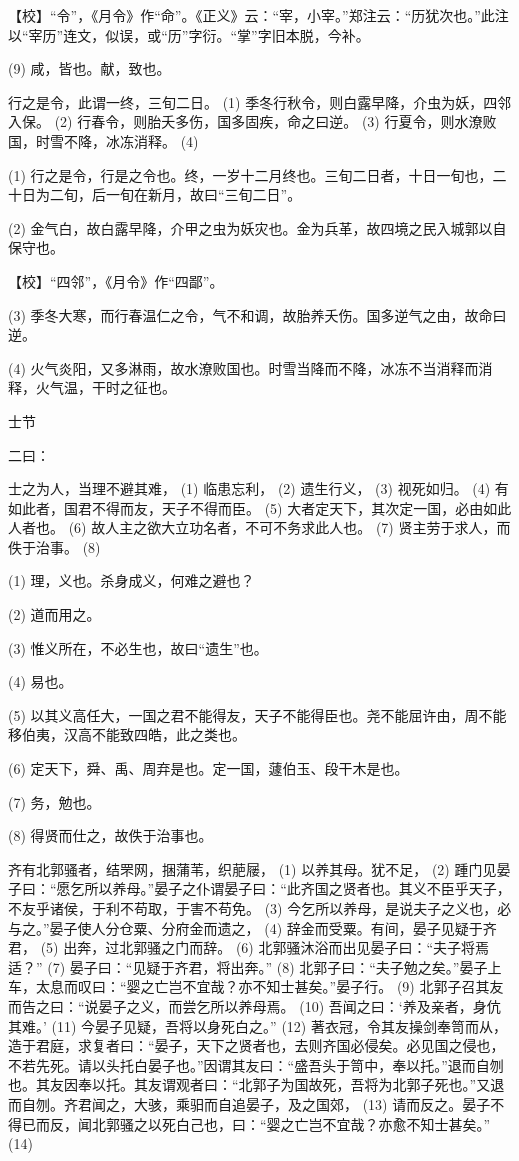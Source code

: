 \documentclass[12pt,UTF8]{ctexbook}
\begin{document}
【校】“令”，《月令》作“命”。《正义》云：“宰，小宰。”郑注云：“历犹次也。”此注以“宰历”连文，似误，或“历”字衍。“掌”字旧本脱，今补。

(9) 咸，皆也。献，致也。

行之是令，此谓一终，三旬二日。 (1) 季冬行秋令，则白露早降，介虫为妖，四邻入保。 (2) 行春令，则胎夭多伤，国多固疾，命之曰逆。 (3) 行夏令，则水潦败国，时雪不降，冰冻消释。 (4)

(1) 行之是令，行是之令也。终，一岁十二月终也。三旬二日者，十日一旬也，二十日为二旬，后一旬在新月，故曰“三旬二日”。

(2) 金气白，故白露早降，介甲之虫为妖灾也。金为兵革，故四境之民入城郭以自保守也。

【校】“四邻”，《月令》作“四鄙”。

(3) 季冬大寒，而行春温仁之令，气不和调，故胎养夭伤。国多逆气之由，故命曰逆。

(4) 火气炎阳，又多淋雨，故水潦败国也。时雪当降而不降，冰冻不当消释而消释，火气温，干时之征也。





士节


二曰：

士之为人，当理不避其难， (1) 临患忘利， (2) 遗生行义， (3) 视死如归。 (4) 有如此者，国君不得而友，天子不得而臣。 (5) 大者定天下，其次定一国，必由如此人者也。 (6) 故人主之欲大立功名者，不可不务求此人也。 (7) 贤主劳于求人，而佚于治事。 (8)

(1) 理，义也。杀身成义，何难之避也？

(2) 道而用之。

(3) 惟义所在，不必生也，故曰“遗生”也。

(4) 易也。

(5) 以其义高任大，一国之君不能得友，天子不能得臣也。尧不能屈许由，周不能移伯夷，汉高不能致四皓，此之类也。

(6) 定天下，舜、禹、周弃是也。定一国，蘧伯玉、段干木是也。

(7) 务，勉也。

(8) 得贤而仕之，故佚于治事也。

齐有北郭骚者，结罘网，捆蒲苇，织萉屦， (1) 以养其母。犹不足， (2) 踵门见晏子曰：“愿乞所以养母。”晏子之仆谓晏子曰：“此齐国之贤者也。其义不臣乎天子，不友乎诸侯，于利不苟取，于害不苟免。 (3) 今乞所以养母，是说夫子之义也，必与之。”晏子使人分仓粟、分府金而遗之， (4) 辞金而受粟。有间，晏子见疑于齐君， (5) 出奔，过北郭骚之门而辞。 (6) 北郭骚沐浴而出见晏子曰：“夫子将焉适？” (7) 晏子曰：“见疑于齐君，将出奔。” (8) 北郭子曰：“夫子勉之矣。”晏子上车，太息而叹曰：“婴之亡岂不宜哉？亦不知士甚矣。”晏子行。 (9) 北郭子召其友而告之曰：“说晏子之义，而尝乞所以养母焉。 (10) 吾闻之曰：‘养及亲者，身伉其难。’ (11) 今晏子见疑，吾将以身死白之。” (12) 著衣冠，令其友操剑奉笥而从，造于君庭，求复者曰：“晏子，天下之贤者也，去则齐国必侵矣。必见国之侵也，不若先死。请以头托白晏子也。”因谓其友曰：“盛吾头于笥中，奉以托。”退而自刎也。其友因奉以托。其友谓观者曰：“北郭子为国故死，吾将为北郭子死也。”又退而自刎。齐君闻之，大骇，乘驲而自追晏子，及之国郊， (13) 请而反之。晏子不得已而反，闻北郭骚之以死白己也，曰：“婴之亡岂不宜哉？亦愈不知士甚矣。” (14)
\end{document}
